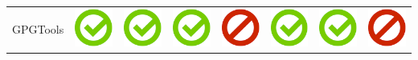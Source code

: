 \documentclass[10pt,foldmark,tumble]{leaflet}
\begin{document}
\begin{center}
{{\begin{tabular}{ L{2cm} | C{2cm} | C{2cm} | C{2cm} | C{2cm} | C{2cm} | C{2cm} | C{2cm} }
GPGTools & \includegraphics[scale=0.1]{pics/haken.png} & \includegraphics[scale=0.1]{pics/haken.png} & \includegraphics[scale=0.1]{pics/haken.png} & \includegraphics[scale=0.1]{pics/nohaken.png} & \includegraphics[scale=0.1]{pics/haken.png} & \includegraphics[scale=0.1]{pics/haken.png} & \includegraphics[scale=0.1]{pics/nohaken.png} \tabularnewline

\end{tabular}}}
\end{center}
\end{document}
